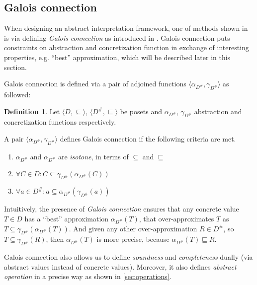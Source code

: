 \documentclass[12pt,oneside]{fithesis2}
\theoremstyle{definition}
\newtheorem{definition}{Definition}
\begin{document}
\subsection{Galois connection}

When designing an abstract interpretation framework, one of methods shown in \cite{CousotCousot92-2} is via defining \textit{Galois connection} as introduced in \cite{CousotCousot76-1}. Galois connection puts constraints on abstraction and concretization function in exchange of interesting properties, e.g. ``best'' approximation, which will be described later in this section.

Galois connection is defined via a pair of adjoined functions $\langle \alpha_{D^\#}, \gamma_{D^\#} \rangle$ as followed: \cite{CousotCousot79-1}

\begin{definition}
  Let $\langle D, \subseteq \rangle$, $\langle D^\#, \sqsubseteq \rangle$ be posets and $\alpha_{D^\#}$, $\gamma_{D^\#}$ abstraction and concretization functions respectively.

  A pair $\langle \alpha_{D^\#}, \gamma_{D^\#} \rangle$ defines Galois connection if the following criteria are met.
  \begin{enumerate}
    \item $\alpha_{D^\#}$ and $\alpha_{D^\#}$ are \textit{isotone}, in terms of $\subseteq$ and $\sqsubseteq$
    \item $\forall C \in D: C \subseteq \gamma_{D^\#}(\alpha_{D^\#}(C))$
    \item $\forall a \in D^\#: a \subseteq \alpha_{D^\#}(\gamma_{D^\#}(a))$
  \end{enumerate}
\end{definition}

Intuitively, the presence of \textit{Galois connection} ensures that any concrete value $T \in D$ has a ``best'' approximation $\alpha_{D^\#}(T)$, that over-approximates $T$ as $T \subseteq \gamma_{D^\#}(\alpha_{D^\#}(T))$. And given any other over-approximation $R \in D^\#$, so $T \subseteq \gamma_{D^\#}(R)$, then $\alpha_{D^\#}(T)$ is more precise, because $\alpha_{D^\#}(T) \sqsubseteq R$.


Galois connection also allows us to define \textit{soundness} and \textit{completeness} dually (via abstract values instead of concrete values). Moreover, it also defines \textit{abstract operation} in a precise way as shown in \ref{sec:operations}.
\end{document}
